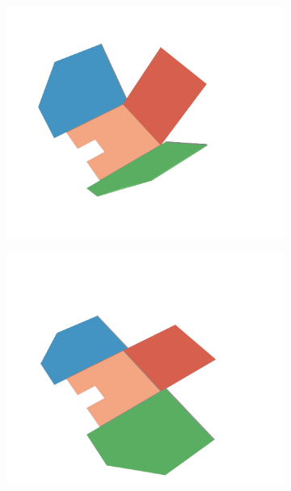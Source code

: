 \begin{figure}[h]
\begin{subfigure}[t]{\subfigureWidth}
		\includegraphics[height=\graphicsHeight]{sections/power-system-design/solar-array/images/deployment/ismenius-cavus/solar_array_deployment_ismenius_cavus_030.png}
		\label{fig:sub:deployment-sequence-ismenius-cavus-mid-bow-and-stern}
	\end{subfigure}\hfill
    \begin{subfigure}[t]{\subfigureWidth}
        \centering
		\includegraphics[height=\graphicsHeight]{sections/power-system-design/solar-array/images/deployment/ismenius-cavus/solar_array_deployment_ismenius_cavus_060.png}

\end{subfigure}
\end{figure}

